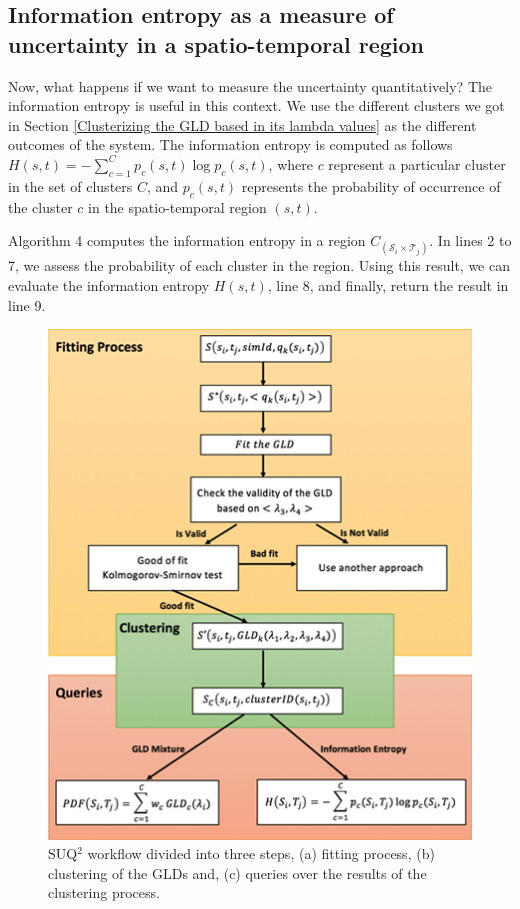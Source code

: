 \documentclass[11pt]{article}
\begin{document}
\subsection{Information entropy as a measure of uncertainty in a spatio-temporal region}
\label{sub:InfomationEntropyRegionWorkflow}
Now, what happens if we want to measure the uncertainty quantitatively? The information entropy is useful in this context. We use the different clusters we got in Section \ref{Clusterizing the GLD based in its lambda values} as the different outcomes of the system. The information entropy is computed as follows $H(s,t)=-\sum_{c=1}^C p_{c}(s,t)\log p_{c}(s,t)$, where $c$ represent a particular cluster in the set of clusters $C$, and $p_{c}(s,t)$ represents the probability of occurrence of the cluster $c$ in the spatio-temporal region $(s,t)$.

Algorithm 4 computes the information entropy in a region $C_{(\mathcal{S}_{i} \times \mathcal{T}_{j})}$. In lines 2 to 7, we assess the probability of each cluster in the region. Using this result, we can evaluate the information entropy $H(s, t)$, line 8, and finally, return the result in line 9.


\begin{figure}[!ht]
    \centering
    \includegraphics{figs/Diagram.png}
    \caption{SUQ$^2$ workflow divided into three steps, (a) fitting process, (b) clustering of the GLDs and, (c) queries over the results of the clustering process.}
    \label{fig:workflow}
\end{figure}
\end{document}
